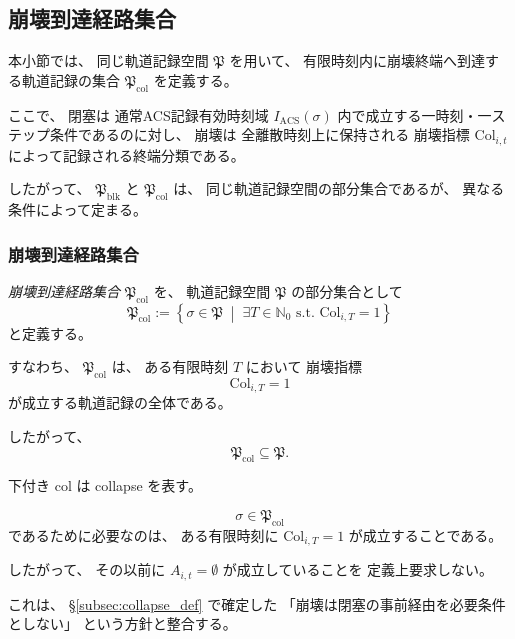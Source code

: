 \subsection{崩壊到達経路集合}
\label{subsec:col_path_set}

本小節では、
同じ軌道記録空間
$\mathfrak{P}$
を用いて、
有限時刻内に崩壊終端へ到達する軌道記録の集合
$\mathfrak{P}_{\mathrm{col}}$
を定義する。

ここで、
閉塞は
通常ACS記録有効時刻域
$I_{\mathrm{ACS}}(\sigma)$
内で成立する一時刻・一ステップ条件であるのに対し、
崩壊は
全離散時刻上に保持される
崩壊指標
$\mathrm{Col}_{i,t}$
によって記録される終端分類である。

したがって、
$\mathfrak{P}_{\mathrm{blk}}$
と
$\mathfrak{P}_{\mathrm{col}}$
は、
同じ軌道記録空間の部分集合であるが、
異なる条件によって定まる。

\subsubsection{崩壊到達経路集合}

\begin{definition}
\label{def:col_path_set}
\emph{崩壊到達経路集合}
$\mathfrak{P}_{\mathrm{col}}$
を、
軌道記録空間
$\mathfrak{P}$
の部分集合として
\[
  \mathfrak{P}_{\mathrm{col}}
  :=
  \left\{
    \sigma\in\mathfrak{P}
    \;\middle|\;
    \exists T\in\mathbb{N}_0
    \text{ s.t. }
    \mathrm{Col}_{i,T}=1
  \right\}
\]
と定義する。

すなわち、
$\mathfrak{P}_{\mathrm{col}}$
は、
ある有限時刻 $T$ において
崩壊指標
\[
  \mathrm{Col}_{i,T}=1
\]
が成立する軌道記録の全体である。

したがって、
\[
  \mathfrak{P}_{\mathrm{col}}
  \subseteq
  \mathfrak{P}.
\]

下付き
$\mathrm{col}$
は
collapse
を表す。
\end{definition}

\begin{remark}[崩壊到達経路集合は閉塞の成立を要求しない]
\label{rem:col_path_no_blockage_requirement}
\[
  \sigma\in\mathfrak{P}_{\mathrm{col}}
\]
であるために必要なのは、
ある有限時刻に
$\mathrm{Col}_{i,T}=1$
が成立することである。

したがって、
その以前に
$A_{i,t}=\emptyset$
が成立していることを
定義上要求しない。

これは、
\S\ref{subsec:collapse_def}
で確定した
「崩壊は閉塞の事前経由を必要条件としない」
という方針と整合する。
\end{remark}

